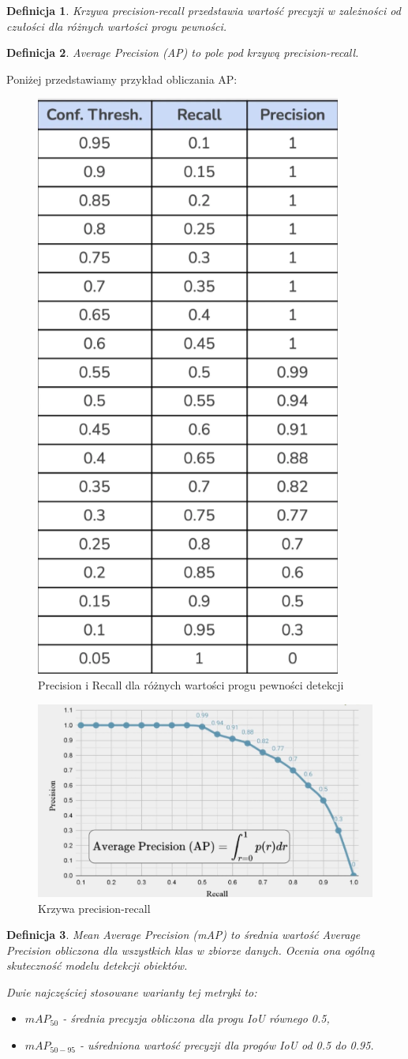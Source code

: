 \documentclass[licencjacka]{pracamgr}
\newtheorem{defi}{Definicja}[section]
\begin{document}
\begin{defi}\label{PR}
\emph{Krzywa precision-recall} przedstawia wartość precyzji w zależności od czułości dla różnych wartości progu pewności.
\end{defi}

\begin{defi}\label{ap}
\emph{Average Precision} (AP) to pole pod krzywą precision-recall.
\end{defi}

Poniżej przedstawiamy przykład obliczania AP:

\begin{figure}[h]
    \centering
    \includegraphics[width=0.35\linewidth]{tabd.png}
    \caption{Precision i Recall dla różnych wartości progu pewności detekcji}
    \label{fig:not}
\end{figure}
\FloatBarrier

\begin{figure}[h]
    \centering
    \includegraphics[width=0.58\linewidth]{Curveled.png}
    \caption{Krzywa precision-recall}
    \label{fig:good}
\end{figure}

\begin{defi}\label{map}
\emph{Mean Average Precision} (mAP) to średnia wartość Average Precision obliczona dla wszystkich klas w zbiorze danych. Ocenia ona ogólną skuteczność modelu detekcji obiektów.

Dwie najczęściej stosowane warianty tej metryki to:
\begin{itemize}
\item $mAP_{50}$ - średnia precyzja obliczona dla progu IoU równego 0.5,
\item $mAP_{50-95}$ - uśredniona wartość precyzji dla progów IoU od 0.5 do 0.95.
\end{itemize}
\end{defi}
\end{document}
